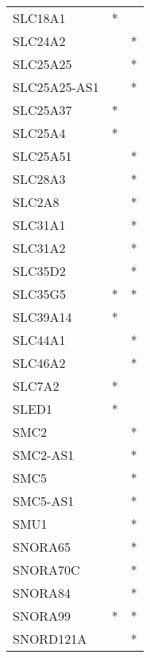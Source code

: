 \begin{longtable}{lcc}
SLC18A1               &              * &            \\
SLC24A2               &                &          * \\
SLC25A25              &                &          * \\
SLC25A25-AS1          &                &          * \\
SLC25A37              &              * &            \\
SLC25A4               &              * &            \\
SLC25A51              &                &          * \\
SLC28A3               &                &          * \\
SLC2A8                &                &          * \\
SLC31A1               &                &          * \\
SLC31A2               &                &          * \\
SLC35D2               &                &          * \\
SLC35G5               &              * &          * \\
SLC39A14              &              * &            \\
SLC44A1               &                &          * \\
SLC46A2               &                &          * \\
SLC7A2                &              * &            \\
SLED1                 &              * &            \\
SMC2                  &                &          * \\
SMC2-AS1              &                &          * \\
SMC5                  &                &          * \\
SMC5-AS1              &                &          * \\
SMU1                  &                &          * \\
SNORA65               &                &          * \\
SNORA70C              &                &          * \\
SNORA84               &                &          * \\
SNORA99               &              * &          * \\
SNORD121A             &                &          * \\

\end{longtable}
